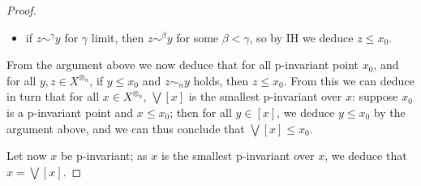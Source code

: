\begin{proof}
\begin{itemize}
\begin{enumerate}
	\end{enumerate}

\item if $z\sim^{\gamma}y$ for $\gamma$ limit, then $z\sim^{\beta}y$ for some $\beta<\gamma$, so by IH we deduce $z\leq x_{0}$.


\end{itemize}
From the argument above we now deduce that for all p-invariant point $x_{0}$, and for all $y,z\in X^{\otimes_{n}}$, if 
$y\leq x_{0}$ and 
$z\sim_{n}y$ holds, then $z\leq x_{0}$.
From this we can deduce in turn that for all $x\in X^{\otimes_{n}}$, $\bigvee[x]$ is the smallest p-invariant over $x$: suppose $x_{0}$ is a p-invariant point and $x\leq x_{0}$; then for all $y\in [x]$, we deduce $y\leq x_{0}$ by the argument above, and we can thus conclude that $\bigvee[x]\leq x_{0}$.

Let now $x$ be p-invariant; as $x$ is the smallest p-invariant over $x$, we deduce that $x= \bigvee[x]$.



\end{proof}
